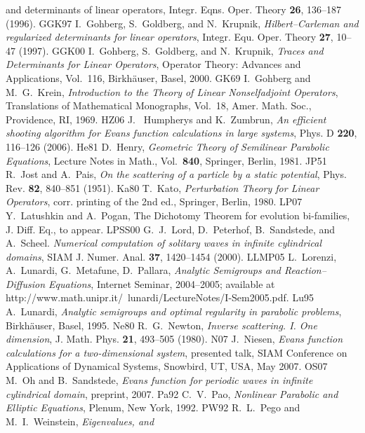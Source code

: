 \begin{thebibliography}{99}
{and determinants of linear operators}, Integr. Eqns. Oper. Theory {\bf
26}, 136--187 (1996).
{\bibitem}{GGK97} I.\ Gohberg, S.\ Goldberg, and N.\ Krupnik, {\it
Hilbert--Carleman and regularized determinants for linear operators},
Integr. Equ. Oper. Theory {\bf 27}, 10--47 (1997).
{\bibitem}{GGK00} I.\ Gohberg, S.\ Goldberg, and N.\ Krupnik, {\it Traces and
Determinants for Linear Operators}, Operator Theory: Advances and
Applications, Vol.\ 116, Birkh\"auser, Basel, 2000.
{\bibitem}{GK69} I.\ Gohberg and M.\ G.\ Krein, {\it Introduction to the Theory of
Linear Nonselfadjoint Operators}, Translations of Mathematical Monographs,
Vol.\ 18, Amer. Math. Soc., Providence, RI, 1969.
{\bibitem}{HZ06} J. \ Humpherys and K.\ Zumbrun, {\it An efficient shooting
algorithm for {E}vans function calculations in large systems},
Phys. D {\bf 220}, 116--126 (2006).
{\bibitem}{He81} D.\ Henry, {\it Geometric Theory of Semilinear Parabolic Equations},
Lecture Notes in Math., Vol.\ {\bf 840}, Springer, Berlin, 1981.
{\bibitem}{JP51} R.\ Jost and A.\ Pais, {\it On the scattering of a particle by a
static potential}, Phys. Rev. {\bf 82}, 840--851 (1951).
{\bibitem}{Ka80} T.\ Kato, {\it Perturbation Theory for Linear Operators},
corr. printing of the 2nd ed., Springer, Berlin, 1980.
{\bibitem}{LP07} Y.\ Latushkin and A.\ Pogan,
The Dichotomy Theorem for evolution bi-families, J. Diff. Eq., to appear.
{\bibitem}{LPSS00}
G.\ J.\ Lord, D.\ Peterhof, B.\ Sandstede, and A.\ Scheel.
{\it Numerical computation of solitary waves in infinite cylindrical 
domains}, SIAM J. Numer. Anal. {\bf 37}, 1420--1454 (2000).
{\bibitem}{LLMP05} L.\ Lorenzi, A.\ Lunardi, G.\ Metafune, D.\ Pallara, {\it Analytic
Semigroups and Reaction--Diffusion Equations}, Internet Seminar, 2004--2005;
available at  \\
http://www.math.unipr.it/~lunardi/LectureNotes/I-Sem2005.pdf.
{\bibitem}{Lu95} A.\ Lunardi, {\it Analytic semigroups and optimal
regularity in parabolic
problems}, Birkh\"auser, Basel, 1995.
{\bibitem}{Ne80} R.\ G.\ Newton, {\it Inverse scattering. I. One dimension},
J. Math. Phys. {\bf 21}, 493--505 (1980).
{\bibitem}{N07} J.\ Niesen, {\it Evans function calculations for a
two-dimensional system}, presented talk,
SIAM Conference on Applications of Dynamical Systems, Snowbird, UT, USA,
May 2007.
{\bibitem}{OS07} M.\ Oh and B.\ Sandstede,
{\it Evans function for periodic waves in infinite cylindrical domain},
preprint, 2007.
{\bibitem}{Pa92} C.\ V.\ Pao, {\it Nonlinear Parabolic and Elliptic Equations},
Plenum, New York, 1992.
{\bibitem}{PW92} R.\ L.\ Pego and M.\ I.\ Weinstein, {\it Eigenvalues, and
}
\end{thebibliography}
